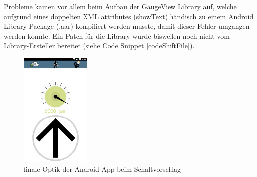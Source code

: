 Probleme kamen vor allem beim Aufbau der GaugeView Library auf, welche aufgrund eines doppelten XML attributes (showText) händisch zu einem Android Library Package (.aar) kompiliert werden musste, damit dieser Fehler umgangen werden konnte. Ein Patch für die Library wurde bisweilen noch nicht vom Library-Ersteller bereitet (siehe Code Snippet \ref{codeShiftFile}).





\begin{figure}[!htb]\centering
		\includegraphics[width=0.3\textwidth]{images/schalt}
		\caption{finale Optik der Android App beim Schaltvorschlag} \label{fig:imgShiftAndroidFinished}
\end{figure}


\clearpage %